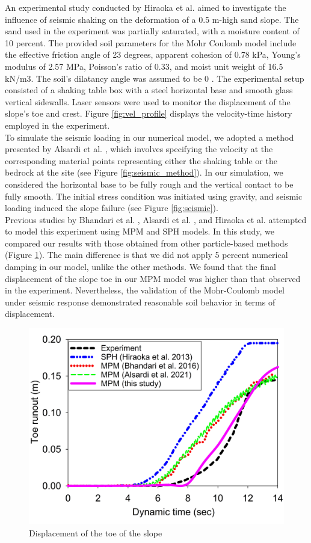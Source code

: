 \documentclass[preprint,12pt]{elsarticle}
\begin{document}
%
%
An experimental study conducted by Hiraoka et al. \cite{Hiraoka} aimed to investigate the influence of seismic shaking on the deformation of a 0.5 m-high sand slope. The sand used in the experiment was partially saturated, with a moisture content of 10 percent. The provided soil parameters for the Mohr Coulomb model include the effective friction angle of 23 degrees, apparent cohesion of 0.78 kPa, Young's modulus of 2.57 MPa, Poisson's ratio of 0.33, and moist unit weight of 16.5 kN/m3. The soil's dilatancy angle was assumed to be 0 \cite{Hiraoka}. The experimental setup consisted of a shaking table box with a steel horizontal base and smooth glass vertical sidewalls. Laser sensors were used to monitor the displacement of the slope's toe and crest. Figure \ref{fig:vel_profile} displays the velocity-time history employed in the experiment.\\
To simulate the seismic loading in our numerical model, we adopted a method presented by Alsardi et al. \cite{Alsardi}, which involves specifying the velocity at the corresponding material points representing either the shaking table or the bedrock at the site (see Figure \ref{fig:seismic_method}). In our simulation, we considered the horizontal base to be fully rough and the vertical contact to be fully smooth. The initial stress condition was initiated using gravity, and seismic loading induced the slope failure (see Figure \ref{fig:seismic}).\\
Previous studies by Bhandari et al. \cite{Bhandari}, Alsardi et al. \cite{Alsardi}, and Hiraoka et al. \cite{Hiraoka} attempted to model this experiment using MPM and SPH models. In this study, we compared our results with those obtained from other particle-based methods (Figure \ref{fig:Toe}). The main difference is that we did not apply 5 percent numerical damping in our model, unlike the other methods. We found that the final displacement of the slope toe in our MPM model was higher than that observed in the experiment. Nevertheless, the validation of the Mohr-Coulomb model under seismic response demonstrated reasonable soil behavior in terms of displacement.
%
%
\begin{figure}[H]
\center
\includegraphics[scale=0.4]{Toe.jpg}
\caption{Displacement of the toe of the slope}
\label{fig:Toe}
\end {figure}
%
%
\end{document}
